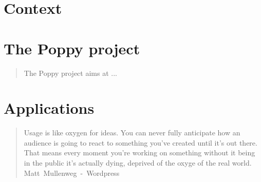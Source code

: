 \documentclass[%
    paper=A4,                   %
    twoside=true,               %
    openright,                  %
    parskip=full,               %
    chapterprefix=true,         %
    11pt,                       %
    headings=normal,            %
    bibliography=totoc,         %
    listof=totoc,               %
    titlepage=on,               %
    captions=tableabove,        %
    draft=false,                %
]{scrreprt}%
\newcommand*{\signed}[1]{%
  \unskip\hspace*{1em plus 1fill}%
  \nolinebreak[3]\hspace*{\fill}\mbox{#1}
}
\begin{document}


\pagestyle{plain}               %

\setcounter{page}{1}            %
\pagestyle{maincontentstyle}    %


% 


\part{Context} %




\part{The Poppy project} %
\begin{quotation}
    The Poppy project aims at ...
\end{quotation}




\part{Applications} %
\begin{quotation}
    Usage is like oxygen for ideas. You can never fully anticipate how an audience is going to react to something you’ve created until it’s out there. That means every moment you’re working on something without it being in the public it’s actually dying, deprived of the oxyge of the real world.\\
    \signed{Matt Mullenweg - Wordpress}
\end{quotation}
\end{document}
